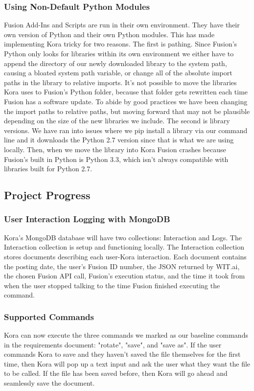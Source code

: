 \documentclass[onecolumn, draftclsnofoot,10pt, compsoc]{IEEEtran}
\begin{document}
    
	    \subsubsection{Using Non-Default Python Modules}
		    Fusion Add-Ins and Scripts are run in their own environment.
		    They have their own version of Python and their own Python modules.
		    This has made implementing Kora tricky for two reasons.
		    The first is pathing.
		    Since Fusion's Python only looks for libraries within its own environment we either have to append the directory of our newly downloaded library to the system path, causing a bloated system path variable, or change all of the absolute import paths in the library to relative imports.
		    It's not possible to move the libraries Kora uses to Fusion's Python folder, because that folder gets rewritten each time Fusion has a software update.
		    To abide by good practices we have been changing the import paths to relative paths, but moving forward that may not be plausible depending on the size of the new libraries we include.
		    The second is library versions.
		    We have ran into issues where we pip install a library via our command line and it downloads the Python 2.7 version since that is what we are using locally.
		    Then, when we move the library into Kora Fusion crashes because Fusion's built in Python is Python 3.3, which isn't always compatible with libraries built for Python 2.7.

		
	\subsection{Project Progress}
		\subsubsection{User Interaction Logging with MongoDB}
			Kora's MongoDB database will have two collections: Interaction and Logs.
			The Interaction collection is setup and functioning locally.
			The Interaction collection stores documents describing each user-Kora interaction.
			Each document contains the posting date, the user's Fusion ID number, the JSON returned by WIT.ai, the chosen Fusion API call, Fusion's execution status, and the time it took from when the user stopped talking to the time Fusion finished executing the command.
			
			
		\subsubsection{Supported Commands}
			Kora can now execute the three commands we marked as our baseline commands in the requirements document: "rotate", "save", and "save as".
			If the user commands Kora to save and they haven't saved the file themselves for the first time, then Kora will pop up a text input and ask the user what they want the file to be called.
			If the file has been saved before, then Kora will go ahead and seamlessly save the document.
			
\end{document}

